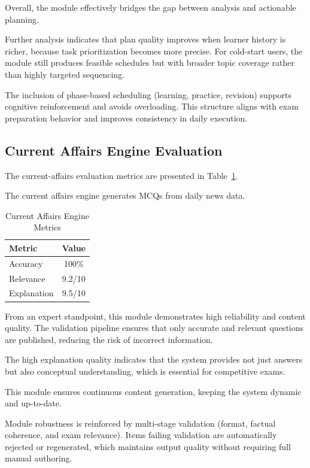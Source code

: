 \begin{sloppypar}
Overall, the module effectively bridges the gap between analysis and actionable planning.

Further analysis indicates that plan quality improves when learner history is richer, because task prioritization becomes more precise. For cold-start users, the module still produces feasible schedules but with broader topic coverage rather than highly targeted sequencing.

The inclusion of phase-based scheduling (learning, practice, revision) supports cognitive reinforcement and avoids overloading. This structure aligns with exam preparation behavior and improves consistency in daily execution.

\subsection{Current Affairs Engine Evaluation}

The current-affairs evaluation metrics are presented in Table~\ref{tab:current_affairs_metrics}.

The current affairs engine generates MCQs from daily news data.

\begin{table}[H]
\centering
\caption{Current Affairs Engine Metrics}
\label{tab:current_affairs_metrics}
\begin{tabular}{|l|c|}
\hline
Metric & Value \\
\hline
Accuracy & 100\% \\
\hline
Relevance & 9.2/10 \\
\hline
Explanation & 9.5/10 \\
\hline
\end{tabular}
\end{table}

From an expert standpoint, this module demonstrates high reliability and content quality. The validation pipeline ensures that only accurate and relevant questions are published, reducing the risk of incorrect information.

The high explanation quality indicates that the system provides not just answers but also conceptual understanding, which is essential for competitive exams.

This module ensures continuous content generation, keeping the system dynamic and up-to-date.

Module robustness is reinforced by multi-stage validation (format, factual coherence, and exam relevance). Items failing validation are automatically rejected or regenerated, which maintains output quality without requiring full manual authoring.


\end{sloppypar}
